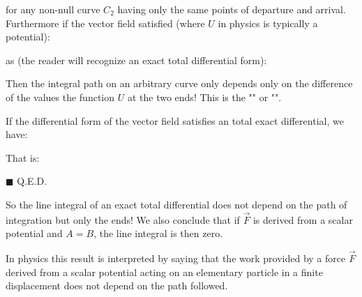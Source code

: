 	for any non-null curve $C_2$ having only the same points of departure and arrival. Furthermore if the vector field satisfied (where $U$ in physics is typically a potential):
	
	as (the reader will recognize an exact total differential form):
	
	Then the integral path on an arbitrary curve only depends only on the difference of the values the function $U$ at the two ends! This is the "" or "".
	\begin{dem}
	If the differential form of the vector field satisfies an total exact differential, we have:
	
	That is:
	
	\begin{flushright}
		$\blacksquare$  Q.E.D.
	\end{flushright}
	\end{dem}
	So the line integral of an exact total differential does not depend on the path of integration but only the ends! We also conclude that if $\vec{F}$ is derived from a scalar potential and $A = B$, the line integral is then zero.
	
	In physics this result is interpreted by saying that the work provided by a force $\vec{F}$ derived from a scalar potential acting on an elementary particle in a finite displacement does not depend on the path followed.
	
